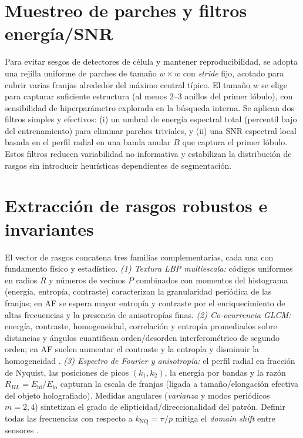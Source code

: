 \section*{Muestreo de parches y filtros energía/SNR}
Para evitar sesgos de detectores de célula y mantener reproducibilidad, se adopta una rejilla uniforme de parches de tamaño $w\times w$ con \emph{stride} fijo, acotado para cubrir varias franjas alrededor del máximo central típico. El tamaño $w$ se elige para capturar suficiente estructura (al menos 2–3 anillos del primer lóbulo), con sensibilidad de hiperparámetro explorada en la búsqueda interna. Se aplican dos filtros simples y efectivos: (i) un umbral de energía espectral total (percentil bajo del entrenamiento) para eliminar parches triviales, y (ii) una SNR espectral local basada en el perfil radial en una banda anular $B$ que captura el primer lóbulo. Estos filtros reducen variabilidad no informativa y estabilizan la distribución de rasgos sin introducir heurísticas dependientes de segmentación.

\section*{Extracción de rasgos robustos e invariantes}
El vector de rasgos concatena tres familias complementarias, cada una con fundamento físico y estadístico. 
\emph{(1) Textura LBP multiescala:} códigos uniformes en radios $R$ y números de vecinos $P$ combinados con momentos del histograma (energía, entropía, contraste) caracterizan la granularidad periódica de las franjas; en AF se espera mayor entropía y contraste por el enriquecimiento de altas frecuencias y la presencia de anisotropías finas. 
\emph{(2) Co-ocurrencia GLCM:} energía, contraste, homogeneidad, correlación y entropía promediados sobre distancias y ángulos cuantifican orden/desorden interferométrico de segundo orden; en AF suelen aumentar el contraste y la entropía y disminuir la homogeneidad \cite{Kiani2022TextureSurvey}. 
\emph{(3) Espectro de Fourier y anisotropía:} el perfil radial en fracción de Nyquist, las posiciones de picos $(k_1,k_2)$, la energía por bandas y la razón $R_{HL}=E_\mathrm{hi}/E_\mathrm{lo}$ capturan la escala de franjas (ligada a tamaño/elongación efectiva del objeto holografiado). Medidas angulares (\emph{varianza} y modos periódicos $m=2,4$) sintetizan el grado de elipticidad/direccionalidad del patrón. Definir todas las frecuencias con respecto a $k_\mathrm{NQ}=\pi/p$ mitiga el \emph{domain shift} entre sensores \cite{Chen2022Photonics}.

